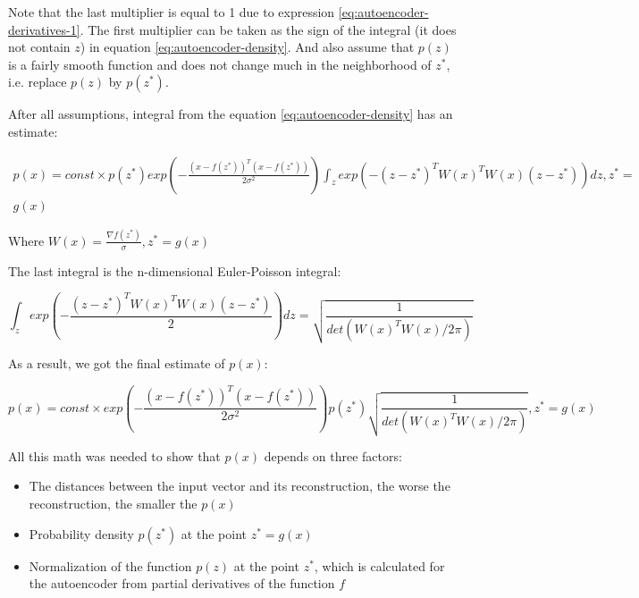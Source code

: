 Note that the last multiplier is equal to 1 due to expression \ref{eq:autoencoder-derivatives-1}. The first multiplier can be taken as the sign of the integral (it does not contain $z$) in equation \ref{eq:autoencoder-density}. And also assume that $p(z)$ is a fairly smooth function and does not change much in the neighborhood of $z^*$, i.e. replace $p(z)$ by $p(z^*)$.

After all assumptions, integral from the equation \ref{eq:autoencoder-density} has an estimate:

\begin{equation}
    \label{eq:autoencoder-probability-estimation}
    \begin{split}
        p(x) = const\times p(z^*)exp(-\frac{(x-f(z^*))^T(x-f(z^*))}{2\sigma^2}) \int_{z}exp(-(z-z^*)^TW(x)^TW(x)(z-z^*)) dz, z^*=\\
        g(x)
    \end{split}
\end{equation}

Where $W(x)=\frac{\nabla f(z^*)}{\sigma}, z^* = g(x)$

The last integral is the n-dimensional Euler-Poisson integral:

\begin{equation}
    \label{eq:autoencoder-euler-poisson}
    \int_{z}exp(-\frac{(z-z^*)^TW(x)^TW(x)(z-z^*)}{2}) dz=\sqrt{\frac{1}{det(W(x)^TW(x)/2\pi)}}
\end{equation}

As a result, we got the final estimate of $p(x)$:

\begin{equation}
    \label{eq:autoencoder-density-final}
    p(x) = const\times exp(-\frac{(x-f(z^*))^T(x-f(z^*))}{2\sigma^2})p(z^*)\sqrt{\frac{1}{det(W(x)^TW(x)/2\pi)}}, z^*=g(x)
\end{equation}

All this math was needed to show that $p(x)$ depends on three factors:

\begin{itemize}
    \item The distances between the input vector and its reconstruction, the worse the reconstruction, the smaller the $p(x)$
    \item Probability density $p(z^*)$ at the point $z^*=g(x)$
    \item Normalization of the function $p(z)$ at the point $z^*$, which is calculated for the autoencoder from partial derivatives of the function $f$
\end{itemize}

